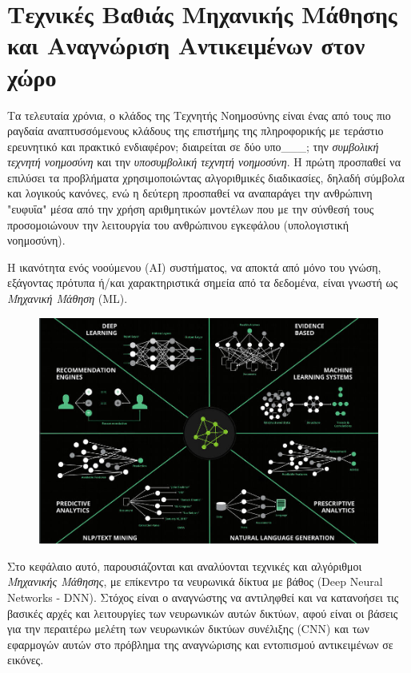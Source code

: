 \chapter{Τεχνικές Βαθιάς Μηχανικής Μάθησης και Αναγνώριση Αντικειμένων στον χώρο}
\label{chapter:theory}

Τα τελευταία χρόνια, ο κλάδος της Τεχνητής Νοημοσύνης είναι ένας από τους πιο ραγδαία
αναπτυσσόμενους κλάδους της επιστήμης της πληροφορικής με τεράστιο
ερευνητικό και πρακτικό ενδιαφέρον; διαιρείται σε δύο υπο\_\_\_; την \emph{συμβολική τεχνητή
νοημοσύνη} και την \emph{υποσυμβολική τεχνητή νοημοσύνη}. Η πρώτη προσπαθεί να
επιλύσει τα προβλήματα χρησιμοποιώντας αλγοριθμικές διαδικασίες, δηλαδή
σύμβολα και λογικούς κανόνες, ενώ η δεύτερη προσπαθεί να αναπαράγει την
ανθρώπινη "ευφυΐα" μέσα από την χρήση αριθμητικών μοντέλων
που με την σύνθεσή τους προσομοιώνουν την λειτουργία του ανθρώπινου εγκεφάλου
(υπολογιστική νοημοσύνη).

Η ικανότητα ενός νοούμενου (AI) συστήματος, να αποκτά από μόνο του γνώση,
εξάγοντας πρότυπα ή/και χαρακτηριστικά σημεία από τα δεδομένα,
είναι γνωστή ως \emph{Μηχανική Μάθηση} (ML).
\begin{figure}[H]
  \centering
  \includegraphics[width=1\textwidth]{./images/chapter3/AI_1.jpg}
  \label{fig:AI_1}
\end{figure}

Στο κεφάλαιο αυτό, παρουσιάζονται και αναλύονται τεχνικές και αλγόριθμοι
\emph{Μηχανικής Μάθησης}, με επίκεντρο τα νευρωνικά δίκτυα με βάθος (Deep Neural Networks - DNN).
Στόχος είναι ο αναγνώστης να αντιληφθεί και να κατανοήσει τις βασικές αρχές και
λειτουργίες των νευρωνικών αυτών δικτύων, αφού είναι οι βάσεις για την περαιτέρω
μελέτη των νευρωνικών δικτύων συνέλιξης (CNN) και των εφαρμογών αυτών στο
πρόβλημα της αναγνώρισης και εντοπισμού αντικειμένων σε εικόνες.




